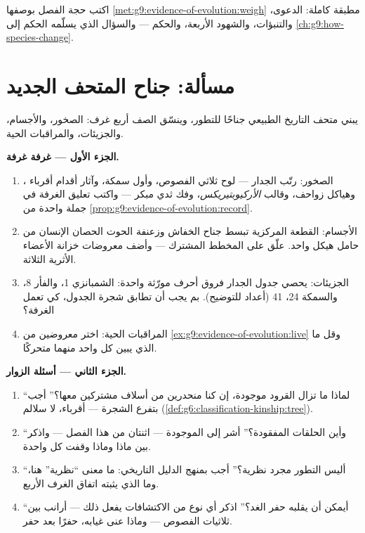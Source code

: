 \begin{exercise}[$\star\star\star$]\label{exo:g9:evidence-of-evolution:12}
اكتب حجة الفصل بوصفها
\cref{met:g9:evidence-of-evolution:weigh} مطبقة كاملة:
الدعوى، والتنبؤات، والشهود الأربعة، والحكم --- والسؤال
الذي يسلّمه الحكم إلى \cref{ch:g9:how-species-change}.
\end{exercise}

\section{مسألة: جناح المتحف الجديد}

\begin{problem}\label{pb:g9:evidence-of-evolution:1}
يبني متحف التاريخ الطبيعي جناحًا للتطور، وينسّق الصف
أربع غرف: الصخور، والأجسام، والجزيئات، والمراقبات الحية.

\medskip\noindent\textbf{الجزء الأول --- غرفة غرفة.}
\begin{enumerate}
  \item الصخور: رتّب الجدار --- لوح ثلاثي الفصوص، وأول
        سمكة، وآثار أقدام أقرباء ، وهياكل
        زواحف، وقالب \emph{الأركيوبتيريكس}، وفك ثدي مبكر
        --- واكتب تعليق الغرفة في جملة واحدة من
        \cref{prop:g9:evidence-of-evolution:record}.
  \item الأجسام: القطعة المركزية تبسط جناح الخفاش وزعنفة
        الحوت  الحصان  الإنسان من حامل هيكل
        واحد. علّق على المخطط المشترك --- وأضف معروضات
        خزانة الأعضاء الأثرية الثلاثة.
  \item الجزيئات: يحصي جدول الجدار فروق أحرف مورّثة
        واحدة: الشمبانزي 1، والفأر 8، والسمكة 24،
         41 (أعداد للتوضيح). بم يجب أن تطابق
        شجرة الجدول، كي تعمل الغرفة؟
  \item المراقبات الحية: اختر معروضين من
        \cref{ex:g9:evidence-of-evolution:live} وقل ما
        الذي يبين كل واحد منهما متحركًا.
\end{enumerate}

\medskip\noindent\textbf{الجزء الثاني --- أسئلة
الزوار.}
\begin{enumerate}[resume]
  \item ``لماذا ما تزال القرود موجودة، إن كنا منحدرين من
        أسلاف مشتركين معها؟'' أجب بتفرع الشجرة ---
        أقرباء، لا سلالم
        (\cref{def:g6:classification-kinship:tree}).
  \item ``وأين الحلقات المفقودة؟'' أشر إلى الموجودة ---
        اثنتان من هذا الفصل --- واذكر بين ماذا وماذا
        وقفت كل واحدة.
  \item ``أليس التطور مجرد نظرية؟'' أجب بمنهج الدليل
        التاريخي: ما معنى ``نظرية'' هنا، وما الذي يثبته
        اتفاق الغرف الأربع.
  \item ``أيمكن أن يقلبه حفر الغد؟'' اذكر أي نوع من
        الاكتشافات يفعل ذلك --- أرانب بين ثلاثيات الفصوص
        --- وماذا عنى غيابه، حفرًا بعد حفر.
\end{enumerate}


\end{problem}
